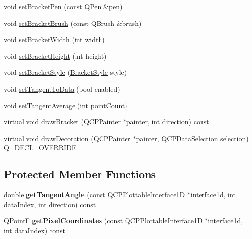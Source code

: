 \begin{DoxyCompactItemize}
\item 
void \hyperlink{classQCPSelectionDecoratorBracket_ac0e392a6097990f8aa978932a8fa05d6}{set\+Bracket\+Pen} (const Q\+Pen \&pen)
\item 
void \hyperlink{classQCPSelectionDecoratorBracket_a2f4ea0bfb0ea980252b76dd349dd53aa}{set\+Bracket\+Brush} (const Q\+Brush \&brush)
\item 
void \hyperlink{classQCPSelectionDecoratorBracket_a291b59cab98ce93a0a3c85963fe10f5e}{set\+Bracket\+Width} (int width)
\item 
void \hyperlink{classQCPSelectionDecoratorBracket_aed773ad737201cca40efc6fe451acad8}{set\+Bracket\+Height} (int height)
\item 
void \hyperlink{classQCPSelectionDecoratorBracket_a04507697438f6ad8cc2aeea5422dcbe5}{set\+Bracket\+Style} (\hyperlink{classQCPSelectionDecoratorBracket_aa6d18517ec0553575bbef0de4252336e}{Bracket\+Style} style)
\item 
void \hyperlink{classQCPSelectionDecoratorBracket_a93bc6086e53a5e40a08641a7b2e2cdd5}{set\+Tangent\+To\+Data} (bool enabled)
\item 
void \hyperlink{classQCPSelectionDecoratorBracket_adb2d0876f25a77c88042b70818f1d6e4}{set\+Tangent\+Average} (int point\+Count)
\item 
virtual void \hyperlink{classQCPSelectionDecoratorBracket_a8153966498e2a8d4c11c681e06d7d692}{draw\+Bracket} (\hyperlink{classQCPPainter}{Q\+C\+P\+Painter} $\ast$painter, int direction) const 
\item 
virtual void \hyperlink{classQCPSelectionDecoratorBracket_a9ebe2e729b5012c0a995d788f87fac22}{draw\+Decoration} (\hyperlink{classQCPPainter}{Q\+C\+P\+Painter} $\ast$painter, \hyperlink{classQCPDataSelection}{Q\+C\+P\+Data\+Selection} selection) Q\+\_\+\+D\+E\+C\+L\+\_\+\+O\+V\+E\+R\+R\+I\+DE
\end{DoxyCompactItemize}
\subsection*{Protected Member Functions}
\begin{DoxyCompactItemize}
\item 
double {\bfseries get\+Tangent\+Angle} (const \hyperlink{classQCPPlottableInterface1D}{Q\+C\+P\+Plottable\+Interface1D} $\ast$interface1d, int data\+Index, int direction) const \hypertarget{classQCPSelectionDecoratorBracket_afa0dedceebf14787e4224ddecb0ed7cd}{}\label{classQCPSelectionDecoratorBracket_afa0dedceebf14787e4224ddecb0ed7cd}

\item 
Q\+PointF {\bfseries get\+Pixel\+Coordinates} (const \hyperlink{classQCPPlottableInterface1D}{Q\+C\+P\+Plottable\+Interface1D} $\ast$interface1d, int data\+Index) const \hypertarget{classQCPSelectionDecoratorBracket_aba1d088001663f3a1c367aab59793773}{}\label{classQCPSelectionDecoratorBracket_aba1d088001663f3a1c367aab59793773}

\end{DoxyCompactItemize}
